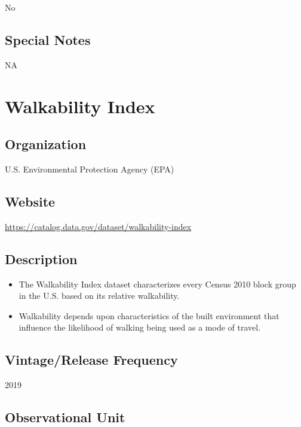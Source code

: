\documentclass[
]{book}
\providecommand{\tightlist}{%
  \setlength{\itemsep}{0pt}\setlength{\parskip}{0pt}}
\begin{document}
No

\hypertarget{special-notes-95}{%
\section{Special Notes}\label{special-notes-95}}

NA

\mainmatter

\hypertarget{walkability-index}{%
\chapter{Walkability Index}\label{walkability-index}}

\hypertarget{organization-96}{%
\section{Organization}\label{organization-96}}

U.S. Environmental Protection Agency (EPA)

\hypertarget{website-96}{%
\section{Website}\label{website-96}}

\url{https://catalog.data.gov/dataset/walkability-index}

\hypertarget{description-96}{%
\section{Description}\label{description-96}}

\begin{itemize}
\tightlist
\item
  The Walkability Index dataset characterizes every Census 2010 block group in the U.S. based on its relative walkability.
\item
  Walkability depends upon characteristics of the built environment that influence the likelihood of walking being used as a mode of travel.
\end{itemize}

\hypertarget{vintagerelease-frequency-96}{%
\section{Vintage/Release Frequency}\label{vintagerelease-frequency-96}}

2019

\hypertarget{observational-unit-96}{%
\section{Observational Unit}\label{observational-unit-96}}
\end{document}
